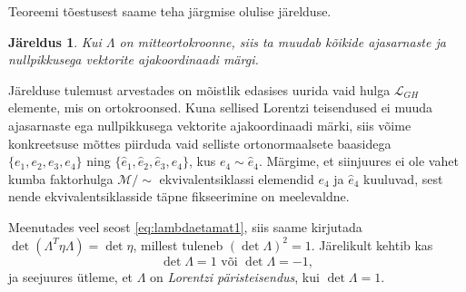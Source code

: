 \documentclass[a4paper,12pt]{article}
\theoremstyle{plain}
\newtheorem{jareldus}{Järeldus}[section]
\theoremstyle{definition}
\numberwithin{equation}{section}
\begin{document}
Teoreemi tõestusest saame teha järgmise olulise järelduse.
\begin{jareldus}
Kui $\Lambda$ on mitteortokroonne, siis ta muudab kõikide ajasarnaste ja nullpikkusega vektorite ajakoordinaadi märgi.
\end{jareldus}

Järelduse tulemust arvestades on mõistlik edasises uurida vaid hulga $\mathcal{L}_{GH}$ elemente, mis on ortokroonsed. Kuna sellised Lorentzi teisendused ei muuda ajasarnaste ega nullpikkusega vektorite ajakoordinaadi märki, siis võime konkreetsuse mõttes piirduda vaid selliste ortonormaalsete baasidega $\{e_1, e_2, e_3, e_4\}$ ning $\{\hat{e}_1, \hat{e}_2, \hat{e}_3, \hat{e}_4\}$, kus $e_4 \sim \hat{e}_4$. Märgime, et siinjuures ei ole vahet kumba faktorhulga $\mathcal{M} / {\sim}$ ekvivalentsiklassi elemendid $e_4$ ja $\hat{e}_4$ kuuluvad, sest nende ekvivalentsiklasside täpne fikseerimine on meelevaldne.

Meenutades veel seost \ref{eq:lambdaetamat1}, siis saame kirjutada $\det\left(\Lambda^T \eta \Lambda\right) = \det \eta$, millest tuleneb $\left(\det \Lambda\right)^2 = 1$. Järelikult kehtib kas
\begin{equation*}
\det \Lambda = 1 \text{ või } \det \Lambda = -1,
\end{equation*}
ja seejuures ütleme, et $\Lambda$ on \emph{Lorentzi päristeisendus}, kui $\det \Lambda = 1$.
\end{document}
